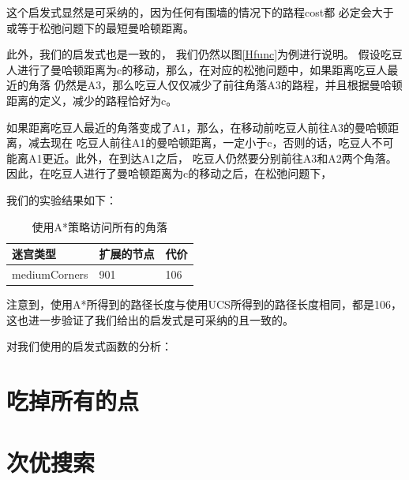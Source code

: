 \documentclass{article}
\begin{document}
这个启发式显然是可采纳的，因为任何有围墙的情况下的路程cost都
必定会大于或等于松弛问题下的最短曼哈顿距离。

此外，我们的启发式也是一致的，
我们仍然以图\ref{Hfunc}为例进行说明。
假设吃豆人进行了曼哈顿距离为c的移动，那么，在对应的松弛问题中，如果距离吃豆人最近的角落
仍然是A3，那么吃豆人仅仅减少了前往角落A3的路程，并且根据曼哈顿距离的定义，减少的路程恰好为c。

如果距离吃豆人最近的角落变成了A1，那么，在移动前吃豆人前往A3的曼哈顿距离，减去现在
吃豆人前往A1的曼哈顿距离，一定小于c，否则的话，吃豆人不可能离A1更近。此外，在到达A1之后，
吃豆人仍然要分别前往A3和A2两个角落。因此，在吃豆人进行了曼哈顿距离为c的移动之后，在松弛问题下，



我们的实验结果如下：
\begin{table}[H]
	\centering
	\caption{使用A*策略访问所有的角落}
	\begin{tabular}{lll}
	\hline
	迷宫类型          & 扩展的节点 & 代价  \\ \hline
	mediumCorners & 901   & 106 \\ \hline
	\end{tabular}
	\end{table}


注意到，使用A*所得到的路径长度与使用UCS所得到的路径长度相同，都是106，
这也进一步验证了我们给出的启发式是可采纳的且一致的。



对我们使用的启发式函数的分析：





\section{吃掉所有的点}






\section{次优搜索}
\end{document}
